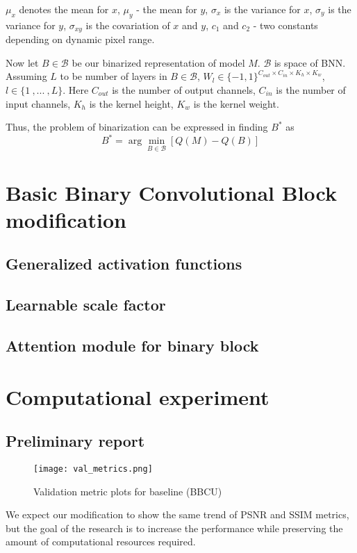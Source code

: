 \documentclass{article}
\begin{document}
$\mu_x$ denotes the mean for $x$, $\mu_y$ - the mean for $y$, $\sigma_x$ is the variance for $x$, $\sigma_y$ is the variance for $y$, $\sigma_{xy}$ is the covariation of $x$ and $y$, $c_1$ and $c_2$ - two constants depending on dynamic pixel range.

Now let $B \in \mathcal{B}$ be our binarized representation of model $M$. $\mathcal{B}$ is space of BNN. Assuming $L$ to be number of layers in $B \in \mathcal{B}$, $W_l \in \{-1, 1\}^{C_{out} \times C_{in} \times K_h \times K_w}$, $l \in \{1 \ , ... \ , L\}$. Here $C_{out}$ is the number of output channels, $C_{in}$ is the number of input channels, $K_h$ is the kernel height, $K_w$ is the kernel weight. 


Thus, the problem of binarization can be expressed in finding $B^{*}$ as
\begin{equation}
    B^{*} = \arg\min\limits_{B \in \mathcal{B}} \left[Q(M) - Q(B)\right]
\end{equation}

\section{Basic Binary Convolutional Block modification}

\subsection{Generalized activation functions}
\subsection{Learnable scale factor}
\subsection{Attention module for binary block}

\section{Computational experiment}
\subsection{Preliminary report}
\begin{figure}[h]
\caption{Validation metric plots for baseline (BBCU)}
\centering
\texttt{[image: val\_metrics.png]}
\end{figure}
We expect our modification to show the same trend of PSNR and SSIM metrics, but the goal of the research is to increase the performance while preserving the amount of computational resources required.




\end{document}
